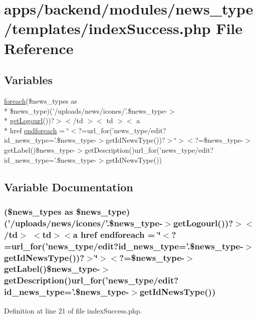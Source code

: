 \hypertarget{backend_2modules_2news__type_2templates_2index_success_8php}{\section{apps/backend/modules/news\-\_\-type/templates/index\-Success.php File Reference}
\label{backend_2modules_2news__type_2templates_2index_success_8php}
}
\subsection*{Variables}
\begin{DoxyCompactItemize}
\item 
\hyperlink{presse_2modules_2news_2templates_2index_success_8php_abc56db52b2e9a59bcd5c9e45ac5cb332}{foreach}(\$news\-\_\-types as \\*
\$news\-\_\-type)('/uploads/news/icones/'.\$news\-\_\-type-\/$>$\\*
\hyperlink{backend_2modules_2tournament_2templates_2index_success_8php_a35941bec2f3cf7beef9b8010a1342325}{get\-Logourl}())?$>$$<$/td $>$$<$ td $>$$<$ a \\*
href \hyperlink{backend_2modules_2news__type_2templates_2index_success_8php_a6b1e10e65446aff182417a869120c026}{endforeach} = \char`\"{}$<$?=url\-\_\-for('news\-\_\-type/edit?id\-\_\-news\-\_\-type='.\$news\-\_\-type-\/$>$get\-Id\-News\-Type())?$>$\char`\"{}$>$$<$?=\$news\-\_\-type-\/$>$get\-Label()\$news\-\_\-type-\/$>$get\-Description()url\-\_\-for('news\-\_\-type/edit?id\-\_\-news\-\_\-type='.\$news\-\_\-type-\/$>$get\-Id\-News\-Type())
\end{DoxyCompactItemize}


\subsection{Variable Documentation}
\hypertarget{backend_2modules_2news__type_2templates_2index_success_8php_a6b1e10e65446aff182417a869120c026}{
\subsubsection[{endforeach}]{ (\$news\-\_\-types as \$news\-\_\-type) ('/uploads/news/icones/'.\$news\-\_\-type-\/$>${\bf get\-Logourl}())?$>$$<$/td$>$ $<$td$>$$<$a href endforeach = \char`\"{}$<$?=url\-\_\-for('news\-\_\-type/edit?id\-\_\-news\-\_\-type='.\$news\-\_\-type-\/$>$get\-Id\-News\-Type())?$>$\char`\"{}$>$$<$?=\$news\-\_\-type-\/$>$get\-Label()\$news\-\_\-type-\/$>$get\-Description()url\-\_\-for('news\-\_\-type/edit?id\-\_\-news\-\_\-type='.\$news\-\_\-type-\/$>$get\-Id\-News\-Type())}}\label{backend_2modules_2news__type_2templates_2index_success_8php_a6b1e10e65446aff182417a869120c026}


Definition at line 21 of file index\-Success.\-php.

